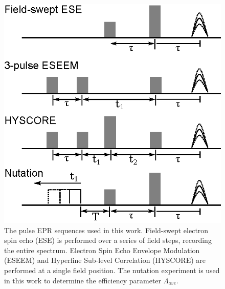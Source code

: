 \begin{figure}[ht]
 \centering
 \includegraphics{Kapitel/Ch1-images/PulseExperiments.eps}
 \caption[Pulse EPR sequences.]{The pulse EPR sequences used in this work. Field-swept electron spin echo (ESE) is performed over a series of field steps, recording the entire spectrum. Electron Spin Echo Envelope Modulation (ESEEM) and Hyperfine Sub-level Correlation (HYSCORE) are performed at a single field position. The nutation experiment is used in this work to determine the efficiency parameter $\Lambda_{ave}$. }
 \label{fig:EPRpulse}
\end{figure}

